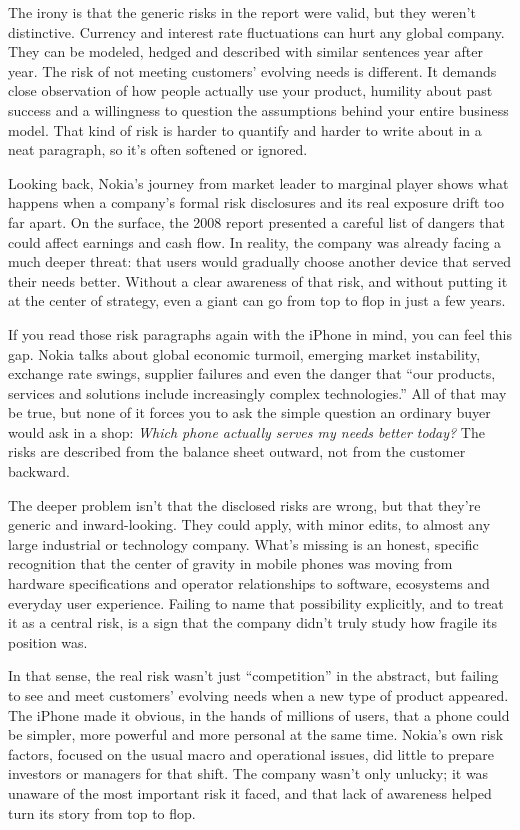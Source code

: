 The irony is that the generic risks in the report were valid, but they weren't distinctive. Currency and interest rate fluctuations can hurt any global company. They can be modeled, hedged and described with similar sentences year after year. The risk of not meeting customers' evolving needs is different. It demands close observation of how people actually use your product, humility about past success and a willingness to question the assumptions behind your entire business model. That kind of risk is harder to quantify and harder to write about in a neat paragraph, so it's often softened or ignored.

Looking back, Nokia's journey from market leader to marginal player shows what happens when a company's formal risk disclosures and its real exposure drift too far apart. On the surface, the 2008 report presented a careful list of dangers that could affect earnings and cash flow. In reality, the company was already facing a much deeper threat: that users would gradually choose another device that served their needs better. Without a clear awareness of that risk, and without putting it at the center of strategy, even a giant can go from top to flop in just a few years.

If you read those risk paragraphs again with the iPhone in mind, you can feel this gap. Nokia talks about global economic turmoil, emerging market instability, exchange rate swings, supplier failures and even the danger that ``our products, services and solutions include increasingly complex technologies.'' All of that may be true, but none of it forces you to ask the simple question an ordinary buyer would ask in a shop: \emph{Which phone actually serves my needs better today?} The risks are described from the balance sheet outward, not from the customer backward.

The deeper problem isn't that the disclosed risks are wrong, but that they're generic and inward-looking. They could apply, with minor edits, to almost any large industrial or technology company. What's missing is an honest, specific recognition that the center of gravity in mobile phones was moving from hardware specifications and operator relationships to software, ecosystems and everyday user experience. Failing to name that possibility explicitly, and to treat it as a central risk, is a sign that the company didn't truly study how fragile its position was.

In that sense, the real risk wasn't just ``competition'' in the abstract, but failing to see and meet customers' evolving needs when a new type of product appeared. The iPhone made it obvious, in the hands of millions of users, that a phone could be simpler, more powerful and more personal at the same time. Nokia's own risk factors, focused on the usual macro and operational issues, did little to prepare investors or managers for that shift. The company wasn't only unlucky; it was unaware of the most important risk it faced, and that lack of awareness helped turn its story from top to flop.